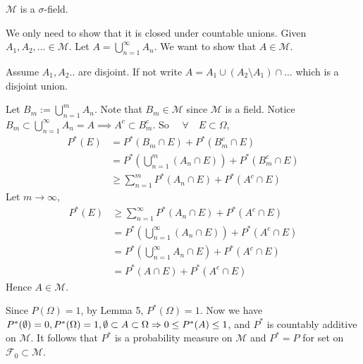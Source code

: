 \documentclass[class=article,crop=false]{standalone}
\begin{document}
\begin{lem}[3]
$\mathcal{M}$ is a $\sigma$-field.
\end{lem}
\begin{prf}
We only need to show that it is closed under countable unions. Given $A_1,A_2,\ldots \in \mathcal{M}$. Let $A=\bigcup_{n= 1}^{\infty} A_n$. We want to show that $A \in \mathcal{M}$.

Assume $A_1, A_2..$ are disjoint. If not write $A = A_1 \cup (A_2\setminus A_1) \cap \ldots$ which is a disjoint union.

Let $B_m:= \bigcup_{n= 1}^{m} A_n$. Note that $B_m \in \mathcal{M}$ since $\mathcal{M}$ is a field. Notice $B_m \subset \bigcup_{n= 1}^{\infty} A_n = A \implies A^{c} \subset  B_m ^{c}$. So $\quad \forall \quad E \subset \Omega$,  
\begin{align*}
	P^* (E) &= P^* (B_m \cap E) + P^* (B_m^{c} \cap E)\\
		&= P^* \left( \bigcup_{n= 1}^{m} (A_n \cap E)  \right) + P^* (B_m ^{c} \cap E) \\
		&\geq \sum_{ n=1}^{m} P^* (A_n \cap E) + P^* (A^{c} \cap E)
\end{align*}
Let $m \to \infty$, 
\begin{align*}
	P^* (E) &\geq \sum_{ n=1}^{\infty} P^* (A_n \cap E) + P^* (A^{c} \cap E) \\
		&= P^* \left( \bigcup_{n= 1}^{\infty} (A_n \cap E) \right) + P^* (A^{c} \cap E)  \\
		&= P^* \left( \bigcup_{n= 1}^{\infty} A_n \cap E \right) + P^* (A^{c} \cap E) \\
		&= P^* (A \cap E) + P^* (A^{c} \cap E)
\end{align*}
Hence $A \in \mathcal{M}$.
\end{prf}

Since $P(\Omega) =1$, by Lemma 5, $P^* (\Omega)=1$. Now we have $P^* (\emptyset) = 0, P ^* (\Omega) =1, \emptyset \subset  A \subset  \Omega \Rightarrow 0 \leq P^* (A) \leq 1$, and $P^*$ is countably additive on  $\mathcal{M}$. It follows that $P^*$ is a probability measure on  $\mathcal{M}$ and $P^*=P$ for set on  $\mathcal{F}_0 \subset \mathcal{M}$.
\end{document}
